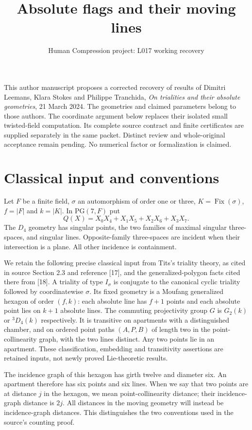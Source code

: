 \documentclass[11pt,a4paper]{article}
\title{Absolute flags and their moving lines}
\author{Human Compression project: L017 working recovery}\date{}
\begin{document}
\maketitle
This author manuscript proposes a corrected recovery of results of Dimitri Leemans, Klara Stokes
and Philippe Tranchida, \emph{On trialities and their absolute geometries},
21 March 2024. The geometries and claimed parameters belong to those authors.
The coordinate argument below replaces their isolated small twisted-field
computation. Its complete source contract and finite certificates are supplied
separately in the same packet. Distinct review and whole-original acceptance
remain pending. No numerical factor or formalization is claimed.

\section{Classical input and conventions}
Let $F$ be a finite field, $\sigma$ an automorphism of order one or three,
$K=\operatorname{Fix}(\sigma)$, $f=|F|$ and $k=|K|$. In $\mathrm{PG}(7,F)$ put
\[
 Q(X)=X_0X_4+X_1X_5+X_2X_6+X_3X_7.
\]
The $D_4$ geometry has singular points, the two families of maximal singular
three-spaces, and singular lines. Opposite-family three-spaces are incident
when their intersection is a plane. All other incidence is containment.

We retain the following precise classical input from Tits's triality theory,
as cited in source Section 2.3 and reference [17], and the generalized-polygon
facts cited there from [18]. A triality of type $I_\sigma$ is conjugate to the
canonical cyclic triality followed by coordinatewise $\sigma$. Its fixed
geometry is a Moufang generalized hexagon of order $(f,k)$: each absolute
line has $f+1$ points and each absolute point lies on $k+1$ absolute lines.
The commuting projectivity group $G$ is $G_2(k)$ or ${}^3D_4(k)$ respectively.
It is transitive on apartments with a distinguished chamber, and on ordered
point paths $(A,P,B)$ of length two in the point-collinearity graph, with
the two lines distinct. Any two points lie in an apartment.
These classification, embedding and transitivity assertions are retained
inputs, not newly proved Lie-theoretic results.

The incidence graph of this hexagon has girth twelve and diameter six.
An apartment therefore has six points and six lines. When we say that two
points are at distance $j$ in the hexagon, we mean point-collinearity distance;
their incidence-graph distance is $2j$. All distances in the moving geometry
will instead be incidence-graph distances. This distinguishes the two
conventions used in the source's counting proof.
\end{document}
